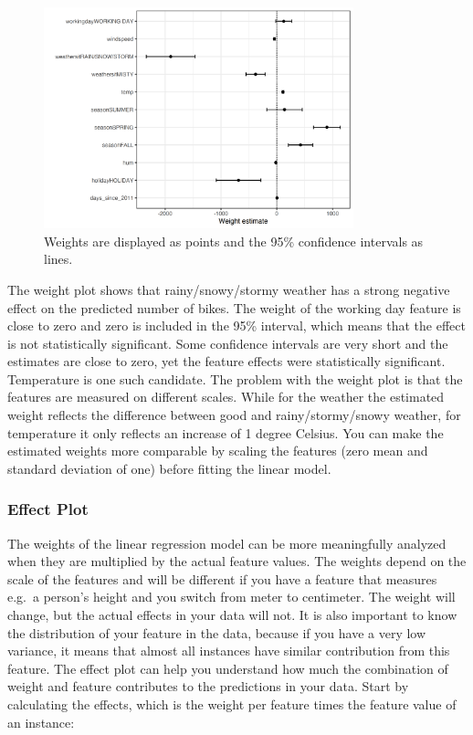 \documentclass[
  10pt,
]{scrbook}
\begin{document}
\begin{figure}

{\centering \includegraphics[width=0.8\textwidth]{images/linear-weights-plot-1} 

}

\caption{Weights are displayed as points and the 95\% confidence intervals as lines.}\label{fig:linear-weights-plot}
\end{figure}

The weight plot shows that rainy/snowy/stormy weather has a strong negative effect on the predicted number of bikes.
The weight of the working day feature is close to zero and zero is included in the 95\% interval, which means that the effect is not statistically significant.
Some confidence intervals are very short and the estimates are close to zero, yet the feature effects were statistically significant.
Temperature is one such candidate.
The problem with the weight plot is that the features are measured on different scales.
While for the weather the estimated weight reflects the difference between good and rainy/stormy/snowy weather, for temperature it only reflects an increase of 1 degree Celsius.
You can make the estimated weights more comparable by scaling the features (zero mean and standard deviation of one) before fitting the linear model.

\hypertarget{effect-plot}{%
\subsubsection{Effect Plot}\label{effect-plot}}

The weights of the linear regression model can be more meaningfully analyzed when they are multiplied by the actual feature values.
The weights depend on the scale of the features and will be different if you have a feature that measures e.g.~a person's height and you switch from meter to centimeter.
The weight will change, but the actual effects in your data will not.
It is also important to know the distribution of your feature in the data, because if you have a very low variance, it means that almost all instances have similar contribution from this feature.
The effect plot can help you understand how much the combination of weight and feature contributes to the predictions in your data.
Start by calculating the effects, which is the weight per feature times the feature value of an instance:
\end{document}
